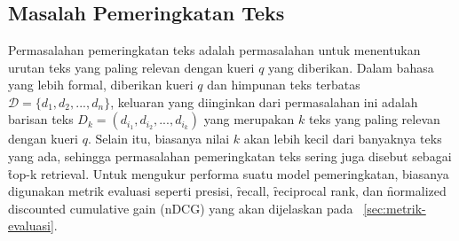\chapter{\babDua}
\label{bab:2}


\section{Masalah Pemeringkatan Teks}
    Permasalahan pemeringkatan teks adalah permasalahan untuk menentukan urutan teks yang paling relevan dengan kueri $q$ yang diberikan. Dalam bahasa yang lebih formal, diberikan kueri $q$ dan himpunan teks terbatas $\mathcal{D}= \{d_1, d_2, ..., d_n\}$, keluaran yang diinginkan dari permasalahan ini adalah barisan teks $D_k = (d_{i_1}, d_{i_2}, ..., d_{i_k})$ yang merupakan $k$ teks yang paling relevan dengan kueri $q$. Selain itu, biasanya nilai $k$ akan lebih kecil dari banyaknya teks yang ada, sehingga permasalahan pemeringkatan teks sering juga disebut sebagai \f{top-k retrieval}. Untuk mengukur performa suatu model pemeringkatan, biasanya digunakan metrik evaluasi seperti presisi, \f{recall}, \f{reciprocal rank}, dan \f{normalized discounted cumulative gain} (nDCG) yang akan dijelaskan pada \sect~\ref{sec:metrik-evaluasi}.

